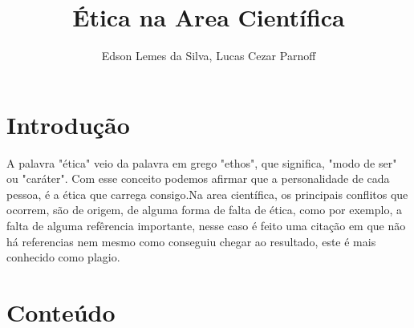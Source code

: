 \documentclass[12pt]{article}
\title{Ética na Area Cientí­fica}
\author{Edson Lemes da Silva, Lucas Cezar Parnoff}
\begin{document}
 

\maketitle

\begin{abstract}
  
\end{abstract}
     
\begin{resumo} 
  
\end{resumo}


\section{Introdução}\label{sec:introducao}
A palavra "ética" veio da palavra em grego "ethos", que significa, "modo de ser" ou "caráter"\cite{signi:etmo}. Com esse conceito podemos afirmar que a personalidade de cada pessoa, é a ética que carrega consigo.Na area científica, os principais conflitos que ocorrem, são
de origem, de alguma forma de falta de ética, como por exemplo, a falta de alguma refêrencia importante, nesse caso é feito uma citação em que não há referencias nem mesmo como conseguiu chegar ao resultado, este é mais conhecido como plagio.
\section{Conteúdo} \label{sec:conteudo}




\end{document}
